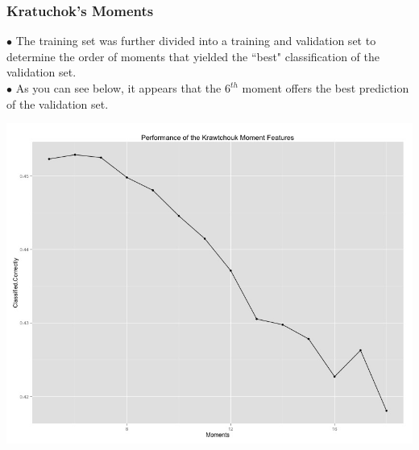 \documentclass{beamer}
\begin{document}
\begin{frame}
\frametitle{Kratuchok's Moments}
$\bullet$ The training set was further divided into a training and validation set to determine the order of moments that yielded the ``best" classification of the validation set. \\
$\bullet$ As you can see below, it appears that the $6^{th}$ moment offers the best prediction of the validation set.
	\begin{center}
		\includegraphics[scale=0.20]{norasta.jpeg}
	\end{center}
\end{frame}

\end{document}

